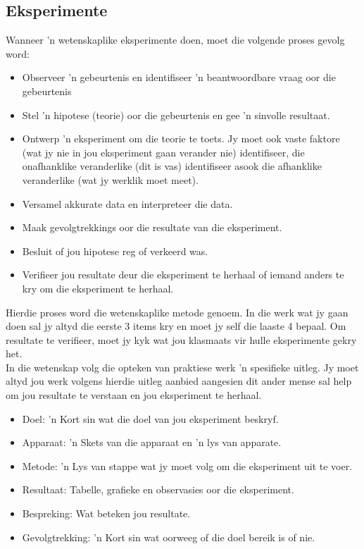\subsection*{Eksperimente}
Wanneer  'n wetenskaplike eksperimente doen, moet die volgende proses gevolg word:
\begin{itemize}
\item Observeer  'n gebeurtenis en identifiseer  'n beantwoordbare vraag oor die gebeurtenis
\item Stel  'n hipotese (teorie) oor die gebeurtenis en gee  'n sinvolle resultaat.
\item Ontwerp  'n eksperiment om die teorie te toets. Jy moet ook vaste faktore (wat jy nie in jou eksperiment gaan verander nie) identifiseer, die onafhanklike veranderlike (dit is vas) identifiseer asook die afhanklike veranderlike (wat jy werklik moet meet).
\item Versamel akkurate data en interpreteer die data.
\item Maak gevolgtrekkings oor die resultate van die eksperiment.
\item Besluit of jou hipotese reg of verkeerd was.
\item Verifieer jou resultate deur die eksperiment te herhaal of iemand anders te kry om die eksperiment te herhaal.
\end{itemize}
Hierdie proses word die wetenskaplike metode genoem. In die werk wat jy gaan doen sal jy altyd die eerste 3 items kry en moet jy self die laaste 4 bepaal. Om resultate te verifieer, moet jy kyk wat jou klasmaats vir hulle eksperimente gekry het. \\
In die wetenskap volg die opteken van praktiese werk  'n spesifieke uitleg. Jy moet altyd jou werk volgens hierdie uitleg aanbied aangesien dit ander mense sal help om jou resultate te verstaan en jou eksperiment te herhaal.
\begin{itemize}
\item Doel:  'n Kort sin wat die doel van jou eksperiment beskryf.
\item Apparaat:  'n Skets van die apparaat en  'n lys van apparate.
\item Metode:  'n Lys van stappe wat jy  moet volg om die eksperiment uit te voer.
\item Resultaat: Tabelle, grafieke en observasies oor die eksperiment.
\item Bespreking: Wat beteken jou resultate.
\item Gevolgtrekking:  'n Kort sin wat oorweeg of die doel bereik is of nie.
\end{itemize}

